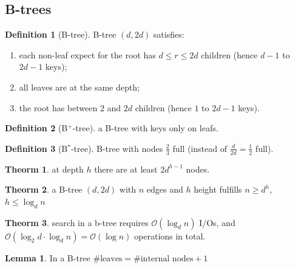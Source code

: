 \documentclass[]{article}
\newcommand\compactsubsection[1]        {\vspace{-10pt}\subsection{#1}\vspace{-5pt}}
\theoremstyle{definition}
\newtheorem{Theorem}{\color{theoColor}Theorm}
\newtheorem{Definition}{\color{defiColor}Definition}
\newtheorem{Lemma}{\color{lemColor}Lemma}
\newcommand\theo  [1] {\begin{Theorem}#1\end{Theorem}}
\newcommand\lem   [1] {\begin{Lemma}#1\end{Lemma}}
\newcommand\oc    {\mathcal{O}}
\newcommand\logn      {\log n}
\begin{document}
\begin{multicols}{4}
			\vspace{-3pt}
			\compactsubsection{B-trees}		
				\begin{Definition}[B-tree]
					B-tree $(d, 2d)$ satisfies: 
					\begin{enumerate}
						\item each non-leaf expect for the root has $d \le r \le 2d$ children (hence $d - 1$ to $2d - 1$ keys);
						\item all leaves are at the same depth;
						\item the root has between $2$ and $2d$ children (hence $1$ to $2d - 1$ keys). 
					\end{enumerate}
				\end{Definition}
				\begin{Definition}[B$^{\text{+}}$-tree]
					a B-tree with keys only on leafs. 
				\end{Definition}
				\begin{Definition}[B$^{\text{*}}$-tree]
					B-tree with nodes $\frac{2}{3}$ full (instead of $\frac{d}{2d} = \frac{1}{2}$ full). 
				\end{Definition}
				\theo{at depth $h$ there are at least $2d^{h - 1}$ nodes. }
				\theo{a B-tree $(d, 2d)$ with $n$ edges and $h$ height fulfills $n \ge d^{h}$, $h \le \log_{d} n$}
				\theo{search in a b-tree requires $\oc(\log_dn)$ I/Os, and $\oc(\log_2 d \cdot \log_d n) = \oc(\logn)$ operations in total. }
				\lem{In a B-tree $\# \text{leaves} = \# \text{internal nodes} + 1$}
				

\end{multicols}
\end{document}
